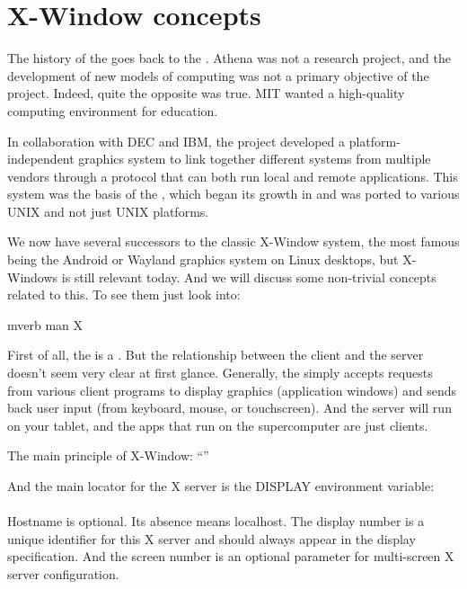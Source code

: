 \section*{X-Window concepts} %

The history of the  goes back to
the . Athena was not a research
project, and the development of new models of computing was not a primary
objective of the project. Indeed, quite the opposite was true. MIT wanted
a high-quality computing environment for education.

In collaboration with DEC and IBM, the project developed a platform-independent
graphics system to link together different systems from multiple vendors
through a protocol that can both run local and remote applications.
This system was the basis of the , which began its
growth in  and was ported to various UNIX and not just UNIX platforms.

We now have several successors to the classic X-Window system, the most
famous being the Android or Wayland graphics system on Linux desktops,
but X-Windows is still relevant today. And we will discuss some
non-trivial concepts related to this. To see them just look into:
\begin{code}{mverb}
man X
\end{code}

First of all, the  is a . But the relationship between the client and
the server doesn't seem very clear at first glance. Generally,
the  simply accepts requests from various client programs
to display graphics (application windows) and sends back user input
(from keyboard, mouse, or touchscreen). And the server will run on your tablet,
and the apps that run on the supercomputer are just clients.

The main principle of X-Window: ``''

And the main locator for the X server is the DISPLAY environment variable:\\
\\
Hostname is optional. Its absence means localhost. The display number is
a unique identifier for this X server and should always appear in the
display specification. And the screen number is an optional parameter for
multi-screen X server configuration.

